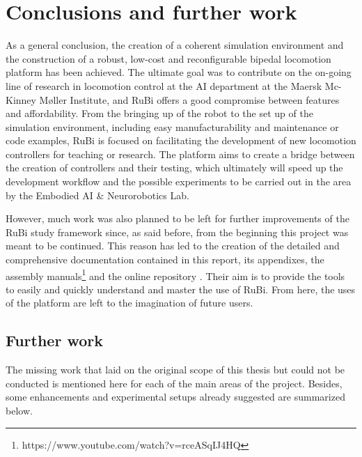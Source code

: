 \chapter{Conclusions and further work} %
\label{cha:conclusions}
As a general conclusion, the creation of a coherent simulation environment and the construction of a robust, low-cost and reconfigurable bipedal locomotion platform has been achieved.
The ultimate goal was to contribute on the on-going line of research in locomotion control at the AI department at the Maersk Mc-Kinney Møller Institute, and RuBi offers a good compromise between features and affordability.
From the bringing up of the robot to the set up of the simulation environment,  including easy manufacturability and maintenance or code examples, RuBi is focused on facilitating the development of new locomotion controllers for teaching or research.
The platform aims to create a bridge between the creation of controllers and their testing, which ultimately will speed up the development workflow and the possible experiments to be carried out in the area by the Embodied AI \& Neurorobotics Lab.

However, much work was also planned to be left for further improvements of the RuBi study framework since, as said before, from the beginning this project was meant to be continued.
This reason has led to the creation of the detailed and comprehensive documentation contained in this report, its appendixes, the assembly manuals\footnote{https://www.youtube.com/watch?v=rceASqIJ4HQ} and the online repository \cite{rubi_repo}.
Their aim is to provide the tools to easily and quickly understand and master the use of RuBi.
From here, the uses of the platform are left to the imagination of future users.

\section{Further work} %
\label{sec:further_work}
The missing work that laid on the original scope of this thesis but could not be conducted is mentioned here for each of the main areas of the project.
Besides, some enhancements and experimental setups already suggested are summarized below.

